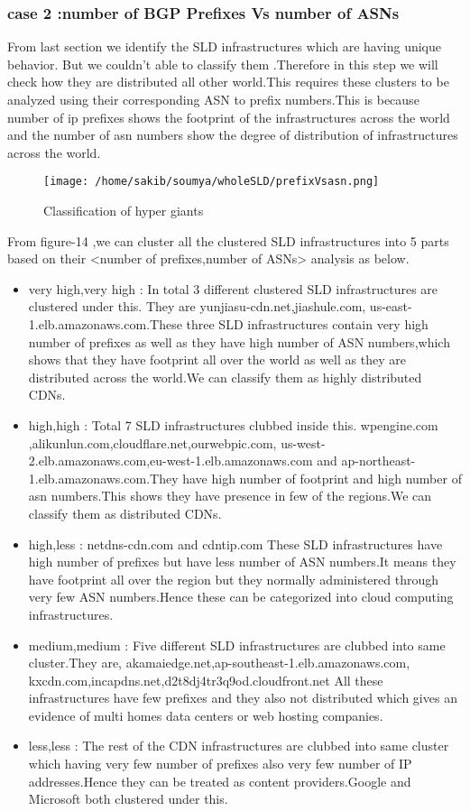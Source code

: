 \subsubsection{case 2 :number of BGP Prefixes Vs number of ASNs}
From last section we identify the SLD infrastructures which are having unique behavior. But we couldn't able to classify them .Therefore in this step we will check how they are distributed all other world.This requires these clusters to be analyzed using their corresponding ASN to prefix numbers.This is because number of ip prefixes shows the footprint of the infrastructures across the world and the number of asn numbers show the degree of distribution of infrastructures across the world.
\begin{figure}[h]
\texttt{[image: /home/sakib/soumya/wholeSLD/prefixVsasn.png]}
\centering
\caption{Classification of hyper giants}
\end{figure}

From figure-14 ,we can cluster all the clustered SLD infrastructures into 5 parts based on their <number of prefixes,number of ASNs> analysis as below.

\begin{itemize}
\item very high,very high :
In total 3 different clustered SLD infrastructures are clustered under this.
They are yunjiasu-cdn.net,jiashule.com,
us-east-1.elb.amazonaws.com.These three SLD infrastructures contain very high number of prefixes as well as they have high number of ASN numbers,which shows that they have footprint all over the world  as well as they are distributed across the world.We can classify them as highly distributed CDNs.
\item high,high : 
Total 7 SLD infrastructures clubbed inside this. wpengine.com
,alikunlun.com,cloudflare.net,ourwebpic.com,
us-west-2.elb.amazonaws.com,eu-west-1.elb.amazonaws.com and 
ap-northeast-1.elb.amazonaws.com.They have high number of footprint and high number of asn numbers.This shows they have presence in few of the regions.We can classify them as distributed CDNs.
\item high,less  :
netdns-cdn.com and cdntip.com
These SLD infrastructures have high number of prefixes but have less number of ASN numbers.It means they have footprint all over the region but they normally administered through very few ASN numbers.Hence these can be categorized into cloud computing infrastructures. 
\item  medium,medium :
Five different SLD infrastructures are clubbed into same cluster.They are,
akamaiedge.net,ap-southeast-1.elb.amazonaws.com,
kxcdn.com,incapdns.net,d2t8dj4tr3q9od.cloudfront.net
 All these infrastructures have few prefixes and they also not distributed which gives an evidence of multi homes data centers or web hosting companies.
\item less,less :
The rest of the CDN infrastructures are clubbed into same cluster which having very few number of prefixes also very few number of IP addresses.Hence they can be treated as content providers.Google and Microsoft both clustered under this.
\end{itemize}

